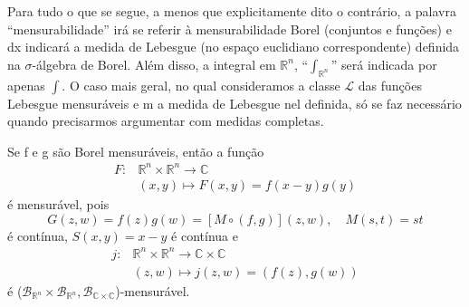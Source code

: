 \documentclass[../distribution_theory_notes.tex]{subfiles}
\begin{document}
  Para tudo o que se segue, a menos que explicitamente dito o contrário, a palavra ``mensurabilidade'' irá se referir à mensurabilidade Borel (conjuntos e funções) e dx indicará a medida de Lebesgue (no espaço euclidiano correspondente) definida na \(\sigma \)-álgebra de Borel. Além disso, a integral em \(\mathbb{R}^{n}\), ``\(\int_{\mathbb{R}^{n}}^{}\)'' será indicada por apenas \(\int\).
  O caso mais geral, no qual consideramos a classe \(\mathcal{L}\) das funções Lebesgue mensuráveis e m a medida de Lebesgue nel definida, só se faz necessário quando precisarmos argumentar com medidas completas.
   \begin{tcolorbox}[
   skin=enhanced,
   title=Observação,
   fonttitle=\bfseries,
 colframe=black,
   colbacktitle=cyan!75!white, 
   colback=cyan!15,
   colbacklower=black,
 coltitle=black,
   drop fuzzy shadow,
   ]
   Se f e g são Borel mensuráveis, então a função 
  \begin{align*}
    F:&\mathbb{R}^{n}\times \mathbb{R}^{n}\rightarrow \mathbb{C}\\ 
      &(x, y)\longmapsto F(x,y)=f(x-y)g(y)
  \end{align*}
  é mensurável, pois 
    \[
      G(z, w)=f(z)g(w) = [M \circ (f, g)](z, w),\quad M(s, t)=st
    \]
    é contínua, \(S(x, y)=x-y\) é contínua e 
   \begin{align*}
     j:&\mathbb{R}^{n}\times \mathbb{R}^{n}\rightarrow \mathbb{C}\times \mathbb{C}\\ 
       & (z, w)\longmapsto j(z, w)= (f(z), g(w))
   \end{align*}
   é (\(\mathcal{B}_{\mathbb{R}^{n}}\times \mathcal{B}_{\mathbb{R}^{n}}, \mathcal{B}_{\mathbb{C}\times \mathbb{C}}\))-mensurável.
   \end{tcolorbox}
\end{document}

